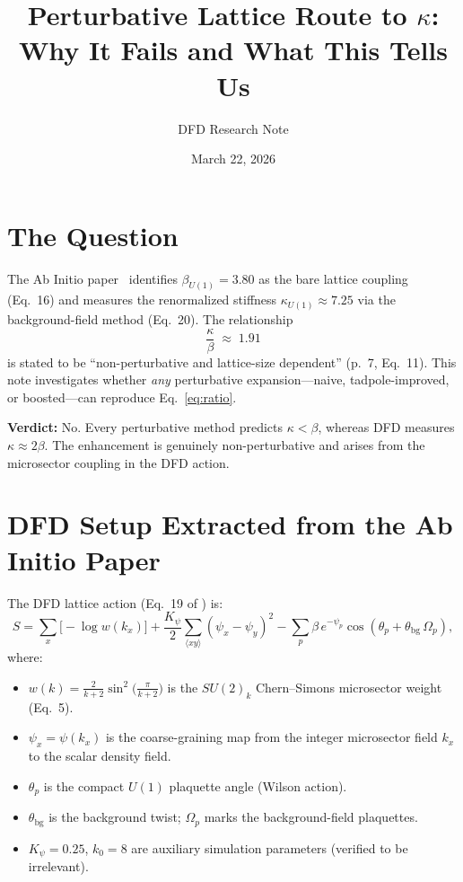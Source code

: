 \documentclass[11pt]{article}
\title{Perturbative Lattice Route to $\kappa$: \\
Why It Fails and What This Tells Us}
\author{DFD Research Note}
\date{March 22, 2026}
\begin{document}
\maketitle

\section{The Question}

The Ab Initio paper~\cite{Alcock2025} identifies $\beta_{U(1)} = 3.80$ as the
bare lattice coupling (Eq.~16) and measures the renormalized stiffness
$\kappa_{U(1)} \approx 7.25$ via the background-field method (Eq.~20).
The relationship
\begin{equation}\label{eq:ratio}
  \frac{\kappa}{\beta} \;\approx\; 1.91
\end{equation}
is stated to be ``non-perturbative and lattice-size dependent'' (p.~7,
Eq.~11).  This note investigates whether \emph{any} perturbative
expansion---naive, tadpole-improved, or boosted---can reproduce
Eq.~\eqref{eq:ratio}.

\medskip\noindent
\textbf{Verdict:} No.  Every perturbative method predicts $\kappa < \beta$,
whereas DFD measures $\kappa \approx 2\beta$.  The enhancement is
genuinely non-perturbative and arises from the microsector coupling
in the DFD action.


\section{DFD Setup Extracted from the Ab Initio Paper}

The DFD lattice action (Eq.~19 of \cite{Alcock2025}) is:
\begin{equation}\label{eq:DFD_action}
  S = \sum_x \bigl[-\log w(k_x)\bigr]
    + \frac{K_\psi}{2}\sum_{\langle xy\rangle}(\psi_x - \psi_y)^2
    - \sum_p \beta\, e^{-\psi_p}\cos(\theta_p + \theta_{\mathrm{bg}}\,\Omega_p),
\end{equation}
where:
\begin{itemize}
  \item $w(k) = \frac{2}{k+2}\sin^2\!\bigl(\frac{\pi}{k+2}\bigr)$ is the
        $SU(2)_k$ Chern--Simons microsector weight (Eq.~5).
  \item $\psi_x = \psi(k_x)$ is the coarse-graining map from the integer
        microsector field $k_x$ to the scalar density field.
  \item $\theta_p$ is the compact $U(1)$ plaquette angle (Wilson action).
  \item $\theta_{\mathrm{bg}}$ is the background twist; $\Omega_p$ marks
        the background-field plaquettes.
  \item $K_\psi = 0.25$, $k_0 = 8$ are auxiliary simulation parameters
        (verified to be irrelevant).
\end{itemize}
\end{document}
